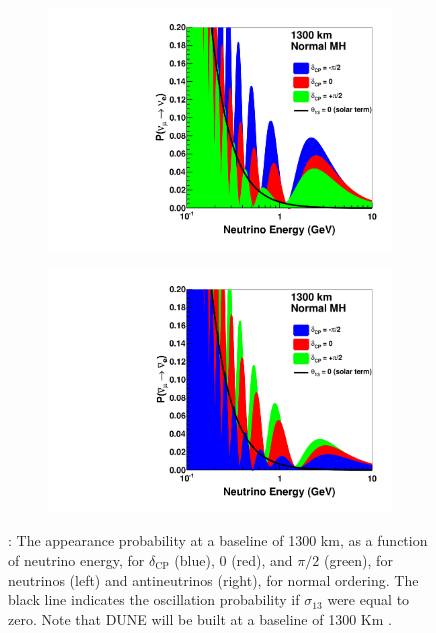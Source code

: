 \begin{figure}[t]
     \centering
     \begin{subfigure}[b]{0.48\textwidth}
         \centering
         \includegraphics[width=\textwidth]{figures/ch3-DUNE/energy_nu_no.pdf}
         \caption{}
         \label{fig:energy_nu_no}
     \end{subfigure}
     \hfill
     \begin{subfigure}[b]{0.48\textwidth}
         \centering
         \includegraphics[width=\textwidth]{figures/ch3-DUNE/energy_anu_no.pdf}
         \caption{}
         \label{fig:energy_anu_no}
     \end{subfigure}
        \caption{: The appearance probability at a baseline of 1300 km, as a function of neutrino energy, for $\delta_\text{CP}$ (blue), 0 (red), and $\pi/2$ (green), for neutrinos (left) and antineutrinos (right), for normal ordering. The black line indicates the oscillation probability if $\sigma_{13}$ were equal to zero. Note that DUNE will be built at a baseline of 1300 Km \cite{DUNE:2020TDR1}. }
        \label{fig:energy_nu}
\end{figure}


